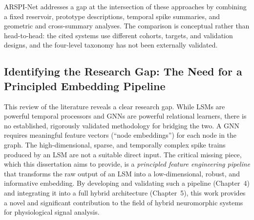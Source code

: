 ARSPI-Net addresses a gap at the intersection of these approaches by combining a fixed reservoir, prototype descriptions, temporal spike summaries, and geometric and cross-summary analyses. The comparison is conceptual rather than head-to-head: the cited systems use different cohorts, targets, and validation designs, and the four-level taxonomy has not been externally validated.

\subsection{Identifying the Research Gap: The Need for a Principled Embedding Pipeline}
\label{sec:research_gap}
This review of the literature reveals a clear research gap. While LSMs are powerful temporal processors and GNNs are powerful relational learners, there is no established, rigorously validated methodology for bridging the two. A GNN requires meaningful feature vectors (``node embeddings'') for each node in the graph. The high-dimensional, sparse, and temporally complex spike trains produced by an LSM are not a suitable direct input. The critical missing piece, which this dissertation aims to provide, is a \emph{principled feature engineering pipeline} that transforms the raw output of an LSM into a low-dimensional, robust, and informative embedding. By developing and validating such a pipeline (Chapter~4) and integrating it into a full hybrid architecture (Chapter~5), this work provides a novel and significant contribution to the field of hybrid neuromorphic systems for physiological signal analysis.
